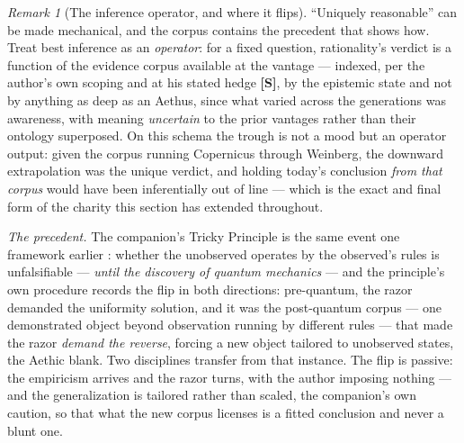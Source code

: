\documentclass[11pt]{article}
\numberwithin{equation}{section}
\theoremstyle{plain}
\theoremstyle{definition}
\theoremstyle{remark}
\newtheorem{remark}[theorem]{Remark}
\begin{document}
\begin{remark}[The inference operator, and where it flips]
\label{gs:rem:inferenceflip}
``Uniquely reasonable'' can be made mechanical, and the corpus
contains the precedent that shows how. Treat best inference as an
\emph{operator}: for a fixed question, rationality's verdict is a
function of the evidence corpus available at the vantage --- indexed,
per the author's own scoping and at his stated hedge \textbf{[S]}, by
the epistemic state and not by anything as deep as an Aethus, since
what varied across the generations was awareness, with meaning
\emph{uncertain} to the prior vantages rather than their ontology
superposed. On this schema the trough is not a mood but an operator
output: given the corpus running Copernicus through Weinberg, the
downward extrapolation was the unique verdict, and holding today's
conclusion \emph{from that corpus} would have been inferentially out
of line --- which is the exact and final form of the charity this
section has extended throughout.

\emph{The precedent.} The companion's Tricky Principle is the same
event one framework earlier \cite{Aethus}: whether the unobserved
operates by the observed's rules is unfalsifiable --- \emph{until the
discovery of quantum mechanics} --- and the principle's own procedure
records the flip in both directions: pre-quantum, the razor demanded
the uniformity solution, and it was the post-quantum corpus ---
one demonstrated object beyond observation running by different
rules --- that made the razor \emph{demand the reverse}, forcing a
new object tailored to unobserved states, the Aethic blank. Two
disciplines transfer from that instance. The flip is passive: the
empiricism arrives and the razor turns, with the author imposing
nothing --- and the generalization is tailored rather than scaled,
the companion's own caution, so that what the new corpus licenses is
a fitted conclusion and never a blunt one.


\end{remark}
\end{document}

